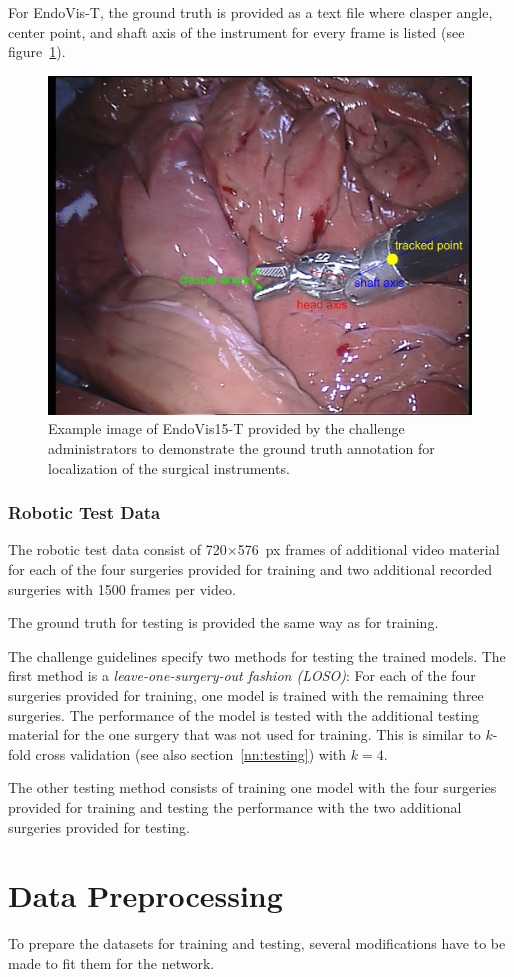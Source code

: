 For EndoVis-T, the ground truth is provided as a text file where clasper angle, center point, and shaft axis of the instrument for every frame is listed (see figure~\ref{example_tracking}).

\begin{figure}
	\centering
	\includegraphics[width=.5\textwidth]{images/dataset/tracking_robotic15/guide_tracking.png}
	\caption[Example ground truth explanation EndoVis15-T]{Example image of EndoVis15-T provided by the challenge administrators to demonstrate the ground truth annotation for localization of the surgical instruments.}
	\label{example_tracking}
\end{figure}

\subsubsection{Robotic Test Data}
\label{sec:endovis15_robotic_test}
The robotic test data consist of 720$\times$576~px frames of additional video material for each of the four surgeries provided for training and two additional recorded surgeries with 1500 frames per video.

The ground truth for testing is provided the same way as for training.

The challenge guidelines specify two methods for testing the trained models.
The first method is a \emph{leave-one-surgery-out fashion (LOSO)}: For each of the four surgeries provided for training, one model is trained with the remaining three surgeries. The performance of the model is tested with the additional testing material for the one surgery that was not used for training. This is similar to $k$-fold cross validation (see also section~\ref{nn:testing}) with $k=4$.

The other testing method consists of training one model with the four surgeries provided for training and testing the performance with the two additional surgeries provided for testing.

\section{Data Preprocessing}
\label{sec:data_preprocessing}
To prepare the datasets for training and testing, several modifications have to be made to fit them for the network. 

